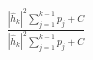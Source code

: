 \documentclass[preview]{standalone}
\begin{document}
\begin{align*}
\frac{\left|{\hat{h}_k}\right|^2\sum_{j=1}^{k-1}p_j+ C}{\left|{\hat{h}_k}\right|^2\sum_{j=1}^{k-1}p_j+ C}
\end{align*}
\end{document}
